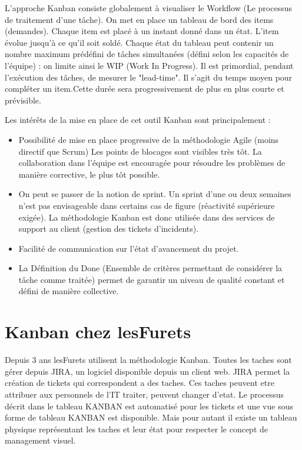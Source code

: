 L'approche Kanban consiste globalement à visualiser le Workflow (Le processus de traitement d'une tâche). On met en place un tableau de bord des items (demandes). Chaque item est placé à un instant donné dans un état. L'item évolue jusqu'à ce qu'il soit soldé. Chaque état du tableau peut contenir un nombre maximum prédéfini de tâches simultanées (défini selon les capacités de l'équipe) : on limite ainsi le WIP (Work In Progress). Il est primordial, pendant l'exécution des tâches, de mesurer le "lead-time". Il s'agit du temps moyen pour compléter un item.Cette durée sera progressivement de plus en plus courte et prévisible.

Les intérêts de la mise en place de cet outil Kanban sont principalement :
\begin{itemize}
\item 
Possibilité de mise en place progressive de la méthodologie Agile (moins directif que Scrum)
Les points de blocages sont visibles très tôt. La collaboration dans l'équipe est encouragée pour résoudre les problèmes de manière corrective, le plus tôt possible.
\item
On peut se passer de la notion de sprint. Un sprint d'une ou deux semaines n'est pas envisageable dans certains cas de figure (réactivité supérieure exigée). La méthodologie Kanban est donc utilisée dans des services de support au client (gestion des tickets d'incidents).
\item
Facilité de communication sur l'état d'avancement du projet.
\item 
La Définition du Done (Ensemble de critères permettant de considérer la tâche comme traitée) permet de garantir un niveau de qualité constant et défini de manière collective.
\end{itemize}

\section{Kanban chez lesFurets}
Depuis 3 ans lesFurets utilisent la méthodologie Kanban.
Toutes les taches sont gérer depuis JIRA, un logiciel disponible depuis un client web. JIRA permet la création de tickets qui correspondent a des taches. Ces taches peuvent etre attribuer aux personnels de l'IT traiter, peuvent changer d'etat. Le processus décrit dans le tableau KANBAN est automatisé pour les tickets et une vue sous forme de tableau KANBAN est disponible. Mais pour autant il existe un tableau physique représentant les taches et leur état pour respecter le concept de management visuel.

